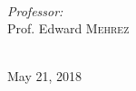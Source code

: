 \begin{titlepage}
\begin{minipage}{0.4\textwidth}
\begin{flushleft}
\end{flushleft}
\end{minipage}
~
\begin{minipage}{0.4\textwidth}
\begin{flushright} \large
\emph{Professor:} \\
Prof. Edward \textsc{Mehrez} %
\end{flushright}
\end{minipage}\\[2cm]



{\large May 21, 2018}\\[2cm] %
 

\vfill %

\end{titlepage}
\onecolumn
\setcounter{tocdepth}{2}
\tableofcontents
\clearpage



